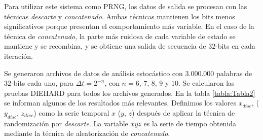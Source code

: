 Para utilizar este sistema como PRNG, los datos de salida se procesan con las técnicas \textit{descarte} y \textit{concatenado}.
Ambas técnicas mantienen los bits menos significativos porque presentan el comportamiento más variable.
En el caso de la técnica de \textit{concatenado}, la parte más ruidosa de cada variable de estado se mantiene y se recombina, y se obtiene una salida de secuencia de $32$-bits en cada iteración.

Se generaron archivos de datos de análisis estocástico con $3.000.000$ palabras de $32$-bits cada uno, para $\Delta t = 2^{-n}$, con $n = 6$, $7$, $8$, $9$ y $10$.
Se calcularon las pruebas DIEHARD para todos los archivos generados.
En la tabla \ref{tabla:Tabla2} se informan algunos de los resultados más relevantes.
Definimos los valores $x_ {disc}$, ($ y_{disc}$, $z_{disc}$) como la serie temporal $x$ ($ y $, $ z $) después de aplicar la técnica de randomización por \textit{descarte}.
La variable $xyz$ es la serie de tiempo obtenida mediante la técnica de aleatorización de \textit{concatenado}.

